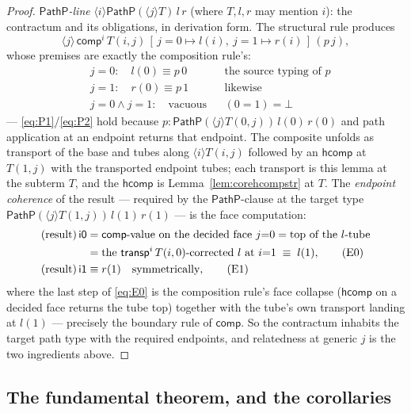 \documentclass{lmcs}
\newcommand{\transp}{\mathsf{transp}}
\newcommand{\hcomp}{\mathsf{hcomp}}
\newcommand{\vcomp}{\mathsf{comp}}
\renewcommand{\conv}{\equiv}
\newcommand{\ii}{\mathsf{i1}}
\newcommand{\io}{\mathsf{i0}}
\begin{document}
\begin{proof}
  \emph{$\mathsf{PathP}$-line}
  $\langle i \rangle \mathsf{PathP}(\langle j \rangle T)\,l\,r$
  (where $T, l, r$ may mention $i$): the contractum and its
  obligations, in derivation form.  The structural rule produces
  \[
    \langle j \rangle\, \vcomp^i\, T(i,j)\,
      [\,j{=}0 \mapsto l(i),\ j{=}1 \mapsto r(i)\,]\,(p\,j),
  \]
  whose premises are exactly the composition rule's:
  \begin{align}
    &j{=}0:\quad l(0) \conv p\,0
      && \text{the source typing of } p
      \tag{P1}\label{eq:P1}\\
    &j{=}1:\quad r(0) \conv p\,1
      && \text{likewise}
      \tag{P2}\label{eq:P2}\\
    &j{=}0 \wedge j{=}1:\quad \text{vacuous}
      && (0 = 1) = \bot
      \tag{P3}\label{eq:P3}
  \end{align}
  --- \eqref{eq:P1}/\eqref{eq:P2} hold because
  $p : \mathsf{PathP}(\langle j \rangle T(0,j))\,l(0)\,r(0)$ and
  path application at an endpoint returns that endpoint.  The
  composite unfolds as transport of the base and tubes along
  $\langle i \rangle T(i,j)$ followed by an $\hcomp$ at $T(1,j)$
  with the transported endpoint tubes; each transport is this lemma
  at the subterm $T$, and the $\hcomp$ is
  Lemma~\ref{lem:corehcompstr} at $T$.  The \emph{endpoint
  coherence} of the result --- required by the
  $\mathsf{PathP}$-clause at the target type
  $\mathsf{PathP}(\langle j \rangle T(1,j))\,l(1)\,r(1)$ --- is the
  face computation:
  \begin{align}
    (\text{result})\,\io
    &= \vcomp\text{-value on the decided face } j{=}0
    = \text{top of the } l\text{-tube} \notag\\
    &= \text{the } \transp^i\,T(i,0)\text{-corrected } l
       \text{ at } i{=}1
    \;\conv\; l(1),
    \tag{E0}\label{eq:E0}\\
    (\text{result})\,\ii
    &\conv r(1) \quad\text{symmetrically},
    \tag{E1}\label{eq:E1}
  \end{align}
  where the last step of \eqref{eq:E0} is the composition rule's
  face collapse ($\hcomp$ on a decided face returns the tube top)
  together with the tube's own transport landing at $l(1)$ ---
  precisely the boundary rule of $\vcomp$.  So the contractum
  inhabits the target path type with the required endpoints, and
  relatedness at generic $j$ is the two ingredients above.
\end{proof}

\subsection{The fundamental theorem, and the corollaries}
\label{app:corefund}
\end{document}
